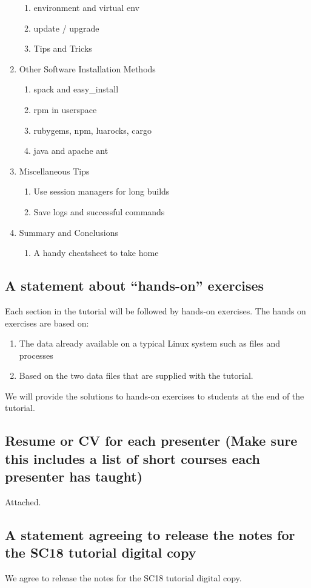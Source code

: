 \documentclass{report}
\begin{document}
\begin{enumerate}
\begin{enumerate}
    \item environment and virtual env
    \item update / upgrade
    \item Tips and Tricks
  \end{enumerate}
\item Other Software Installation Methods
    \begin{enumerate}
        \item spack and easy\_install
        \item rpm in userspace
        \item rubygems, npm, luarocks, cargo
        \item java and apache ant 
    \end{enumerate}
\item Miscellaneous Tips
  \begin{enumerate}
    \item Use session managers for long builds
    \item Save logs and successful commands
  \end{enumerate}
\item Summary and Conclusions
  \begin{enumerate}
    \item A handy cheatsheet to take home
  \end{enumerate}
\end{enumerate}

\subsection*{A statement about ``hands-on'' exercises}
Each section in the tutorial will be followed by hands-on exercises. The hands on exercises are based on:
\begin{enumerate}
\item The data already available on a
typical Linux system such as files and processes
\item Based on the two data
files that are supplied with the tutorial.
\end{enumerate}
We will provide the solutions to hands-on exercises to students at the end of the tutorial.

\subsection*{Resume or CV for each presenter (Make sure this includes a list of short courses each presenter has taught)}
Attached.
\subsection*{A statement agreeing to release the notes for the SC18 tutorial digital copy}
We agree to release the notes for the SC18 tutorial digital copy.
\end{document}
